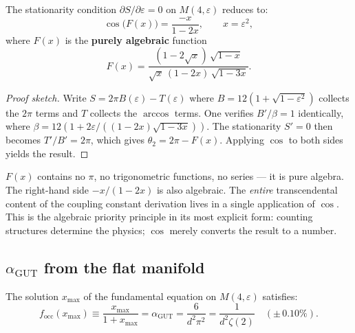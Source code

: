 \begin{theorem}
\label{thm:fundamental_eq}
The stationarity condition $\partial S/\partial\varepsilon = 0$ on $M(4,\varepsilon)$ reduces to:
\begin{equation}
\boxed{\cos\bigl(F(x)\bigr) = \frac{-x}{1-2x}, \qquad x = \varepsilon^2,}
\end{equation}
where $F(x)$ is the \textbf{purely algebraic} function
\begin{equation}
F(x) = \frac{(1-2\sqrt{x})\,\sqrt{1-x}}{\sqrt{x}\,(1-2x)\,\sqrt{1-3x}}.
\end{equation}
\end{theorem}
\begin{proof}[Proof sketch]
Write $S = 2\pi B(\varepsilon) - T(\varepsilon)$ where $B = 12(1 + \sqrt{1\!-\!\varepsilon^2})$ collects the $2\pi$ terms and $T$ collects the $\arccos$ terms.  One verifies $B'/\beta = 1$ identically, where $\beta = 12(1 + 2\varepsilon/((1\!-\!2x)\sqrt{1\!-\!3x}))$.  The stationarity $S' = 0$ then becomes $T'/B' = 2\pi$, which gives $\theta_2 = 2\pi - F(x)$.  Applying $\cos$ to both sides yields the result.
\end{proof}

\begin{remark}
$F(x)$ contains no $\pi$, no trigonometric functions, no series --- it is pure algebra.  The right-hand side $-x/(1\!-\!2x)$ is also algebraic.  The \emph{entire} transcendental content of the coupling constant derivation lives in a single application of $\cos$.  This is the algebraic priority principle in its most explicit form: counting structures determine the physics; $\cos$ merely converts the result to a number.
\end{remark}

\subsection{$\alpha_\text{GUT}$ from the flat manifold}
\label{sec:alpha_manifold}

\begin{theorem}
\label{thm:alpha_manifold}
The solution $x_{\max}$ of the fundamental equation on $M(4,\varepsilon)$ satisfies:
\begin{equation}
\boxed{f_{\mathrm{occ}}(x_{\max}) \equiv \frac{x_{\max}}{1+x_{\max}} = \alpha_\text{GUT} = \frac{6}{d^2\pi^2} = \frac{1}{d^2\zeta(2)} \quad (\pm\,0.10\%).}
\end{equation}
\end{theorem}


